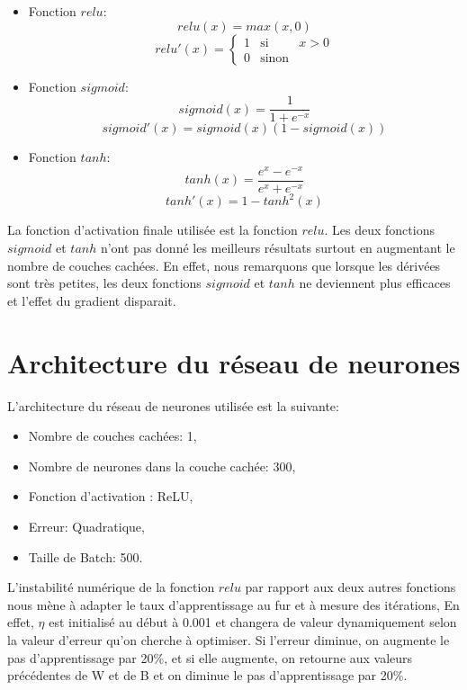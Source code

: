 \documentclass[a4paper,english,12pt]{article}
\begin{document}
\begin{itemize}
	\item Fonction $relu$:	
		$$relu(x)=max(x,0)$$		
		\begin{equation}
		relu'(x) = \left\{ \begin{array}{rcl}
		{1} & \mbox{si}
		& x>0 \\ 0 & \mbox{sinon}
		\end{array}\right.\label{eq2}
		\end{equation}
	\item Fonction $sigmoid$:
		$$ sigmoid(x) = \frac{1}{1 + e^{-x}}$$
		$$sigmoid'(x)=sigmoid(x)(1-sigmoid(x))$$
	\item  Fonction $tanh$:	
		$$ tanh(x) = \frac{e^{x} - e^{-x}}{e^{x} + e^{-x}}$$
		$$ tanh'(x)=1-tanh^2(x)$$
\end{itemize}

La fonction d'activation finale utilisée est la fonction $relu$. Les deux fonctions $sigmoid$ et $tanh$ n'ont pas donné les meilleurs résultats surtout en augmentant le nombre de couches cachées. En effet, nous remarquons que lorsque les dérivées sont très petites, les deux fonctions $sigmoid$ et $tanh$ ne deviennent plus efficaces et l'effet du gradient disparait. 

\section{Architecture du réseau de neurones}
L'architecture du réseau de neurones utilisée est la suivante: 
\begin{itemize}
	\item Nombre de couches cachées: 1,
	\item Nombre de neurones dans la couche cachée: 300,
	\item Fonction d'activation : ReLU,
	\item Erreur: Quadratique,
	\item Taille de Batch: 500.
\end{itemize}

L'instabilité numérique de la fonction $relu$ par rapport aux deux autres fonctions nous mène à adapter le taux d'apprentissage au fur et à mesure des itérations, En effet, $\eta$ est initialisé au début à 0.001 et  changera de valeur dynamiquement selon la valeur d'erreur qu'on cherche à optimiser. Si l'erreur diminue, on augmente le pas d'apprentissage par 20\%, et si elle augmente, on retourne aux valeurs précédentes de W et de B et on diminue le pas d'apprentissage par 20\%.
\end{document}
